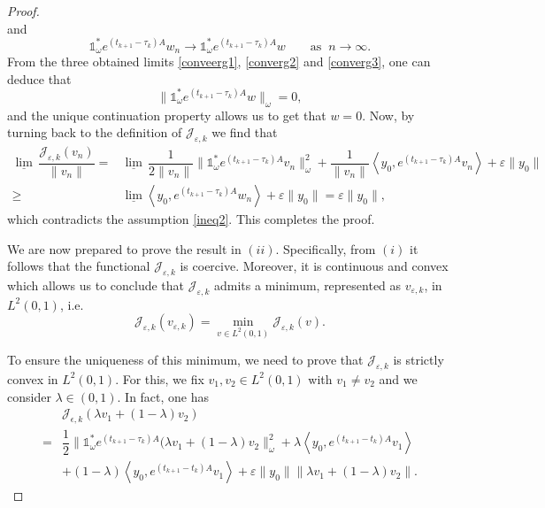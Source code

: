 \documentclass[sn-mathphys]{sn-jnl}
\begin{document}
\begin{proof}
\begin{equation}
    \end{equation}
    and
    \begin{equation}\label{converg3}
        \mathds{1}_{\omega}^{*} e^{(t_{k+1}-\tau_k)A} w_n \to \mathds{1}_{\omega}^{*} e^{(t_{k+1}-\tau_k)A} w \qquad \text{as}\;\; n \to \infty.
    \end{equation}
    From the three obtained limits \eqref{conveerg1}, \eqref{converg2} and \eqref{converg3}, one can deduce that
    \[\| \mathds{1}_{\omega}^{*} e^{(t_{k+1}-\tau_k)A} w \|_{\omega}=0,\]
    and the unique continuation property allows us to get that $w=0$. Now, by turning back to the definition of \(\mathcal{J}_{\varepsilon,k}\) we find that
    \begin{align}\label{ineq5}
        \underline{\lim} \,\dfrac{\mathcal{J}_{\varepsilon,k}(v_n)}{\|v_n\|}
        = &\underline{\lim} \,\dfrac{1}{2\|v_n\|} \| \mathds{1}_{\omega}^{*} e^{(t_{k+1}-\tau_k)A} v_n \|_{\omega}^2 + \dfrac{1}{\|v_n\|} \left\langle y_0, e^{(t_{k+1}-\tau_k)A} v_n \right\rangle + \varepsilon\|y_0\|\nonumber\\
        \geq &\underline{\lim} \left\langle y_0, e^{(t_{k+1}-\tau_k)A} w_n \right\rangle + \varepsilon\|y_0\| = \varepsilon\|y_0\|,
    \end{align}
    which contradicts the assumption \eqref{ineq2}. This completes the proof.
    
    We are now prepared to prove the result in $(ii)$. Specifically, from $(i)$ it follows that the functional \(\mathcal{J}_{\varepsilon,k}\) is coercive. Moreover, it is continuous and convex which allows us to conclude that \(\mathcal{J}_{\varepsilon,k}\) admits a minimum, represented as $v_{\varepsilon,k}$, in $L^2(0,1)$, i.e.
    \begin{equation*}
        \mathcal{J}_{\varepsilon,k}(v_{\varepsilon,k}) = \min_{v \in L^2(0,1)} \mathcal{J}_{\varepsilon,k}(v).
    \end{equation*}
    
    To ensure the uniqueness of this minimum, we need to prove that \(\mathcal{J}_{\varepsilon,k}\) is strictly convex in $L^2(0,1)$. For this, we fix \(v_1,v_2 \in L^2(0,1)\) with \(v_1 \neq v_2\) and we consider $\lambda \in (0,1)$. In fact, one has
    \begin{align}\label{ineq6}
        &\mathcal{J}_{\epsilon,k}(\lambda v_1 + (1-\lambda) v_2)\nonumber\\
        = &\dfrac{1}{2} \| \mathds{1}_{\omega}^{*} e^{(t_{k+1}-\tau_k)A} (\lambda v_1 + (1-\lambda) v_2 \|_{\omega}^2 + \lambda \left\langle y_0, e^{(t_{k+1}-t_k)A} v_1\right\rangle\nonumber\\
        &+ (1-\lambda) \left\langle y_0, e^{(t_{k+1}-t_k)A} v_1\right\rangle + \varepsilon \|y_0\|\| \lambda v_1 + (1-\lambda) v_2 \|.
    \end{align}
    

\end{proof}
\end{document}

